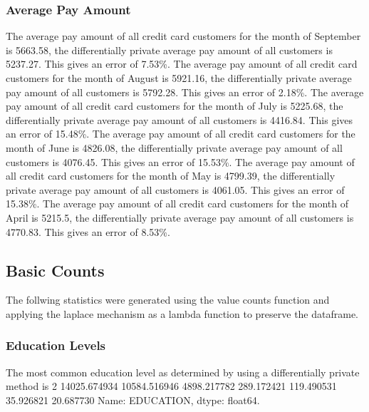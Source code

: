 \documentclass{article}%
\begin{document}
\subsubsection{Average Pay Amount}%
\label{ssubsec:AveragePayAmount}%
The average pay amount of all credit card customers for the month of September is 5663.58, the differentially private average pay amount of all customers is 5237.27. This gives an error of 7.53\%.%
The average pay amount of all credit card customers for the month of August is 5921.16, the differentially private average pay amount of all customers is 5792.28. This gives an error of 2.18\%.%
The average pay amount of all credit card customers for the month of July is 5225.68, the differentially private average pay amount of all customers is 4416.84. This gives an error of 15.48\%.%
The average pay amount of all credit card customers for the month of June is 4826.08, the differentially private average pay amount of all customers is 4076.45. This gives an error of 15.53\%.%
The average pay amount of all credit card customers for the month of May is 4799.39, the differentially private average pay amount of all customers is 4061.05. This gives an error of 15.38\%.%
The average pay amount of all credit card customers for the month of April is 5215.5, the differentially private average pay amount of all customers is 4770.83. This gives an error of 8.53\%.

%
\subsection{Basic Counts}%
\label{subsec:BasicCounts}%
The follwing statistics were generated using the value counts function and applying the laplace mechanism as a lambda function to preserve the dataframe.%
\subsubsection{Education Levels}%
\label{ssubsec:EducationLevels}%
The most common education level as determined by using a differentially private method is 2    14025.674934    10584.516946     4898.217782      289.172421      119.490531       35.926821       20.687730\newline%
Name: EDUCATION, dtype: float64.
\end{document}
